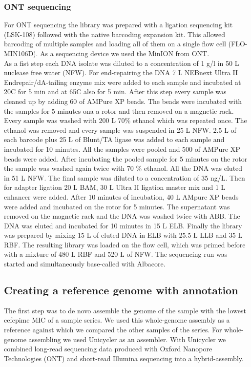 \subsubsection{ONT sequencing}
For ONT sequencing the library was prepared with a ligation sequencing kit (LSK-108) followed with the native barcoding expansion kit. This allowed barcoding of multiple samples and loading all of them on a single flow cell (FLO-MIN106D). As a sequencing device we used the MinION from ONT. \\
As a fist step each DNA isolate was diluted to a concentration of 1 \textmu g/\textmu l in 50 \textmu L nuclease free water (NFW). For end-repairing the DNA 7 \textmu L NEBnext Ultra II Endrepair/dA-tailing enzyme mix were added to each
sample and incubated at 20\degree C for 5 min and at 65\degree C also for 5 min. After this step every sample was cleaned up by adding 60 \textmu of AMPure XP beads. The beads were incubated with the samples for 5 minutes ona a rotor and then removed on a magnetic rack. Every sample was washed with 200 \textmu L 70\% ethanol which was repeated once. The ethanol was removed and every sample was suspended in 25 \textmu L NFW. 2.5 \textmu L of each barcode plus 25 \textmu L of Blunt/TA ligase was added to each sample and incubated for 10 minutes. All the samples were pooled and 500 \textmu of AMPure XP beads were added. After incubating the pooled sample for 5 minutes on the rotor the sample was washed again twice with 70 \% ethanol. All the DNA was eluted in 51 \textmu L NFW. The final sample was diluted to a concentration of 35 ng/\textmu L. Then for adapter ligation 20 \textmu L BAM, 30 \textmu L Ultra II ligation master mix and 1 \textmu L enhancer were added. After 10 minutes of incubation, 40 \textmu L AMpure XP beads were added and incubated on the rotor for 5 minutes. The supernatant was removed on the magnetic rack and the DNA was washed twice with ABB. The DNA was eluted and incubated for 10 minutes in 15 \textmu L ELB. Finally the library was prepared by mixing 15 \textmu L of eluted DNA in ELB with 25.5 \textmu L LLB and 35 \textmu L RBF. The resulting library was loaded on the flow cell, which was primed before with a mixture of 480 \textmu L RBF  and 520 \textmu L of NFW. The sequencing run was started and simultaneously base-called with Albacore.
\label{section:nanopore_sequenicng}

\subsection{Creating a reference genome with annotation} 
The first step was to de novo assemble the genome of the sample with the lowest cefepime MIC of a sample series. We used this whole-genome assembly as a reference against which we compared the other samples of the series. For whole-genome assembling we used Unicycler \cite{wick_unicycler:_2017} as an assembler. With Unicycler \cite{wick_unicycler:_2017} we combined long-read sequencing data produced with Oxford Nanopore Technologies (ONT) and short-read Illumina sequencing into a hybrid-assembly. 

